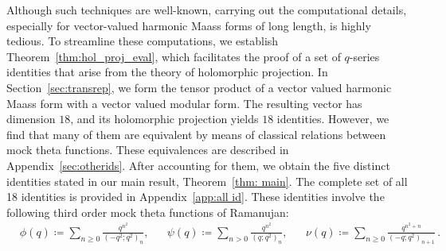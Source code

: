 \documentclass[11pt,reqno]{amsart}
\renewcommand{\=}{\;=\;}
\theoremstyle{myremark}
\begin{document}
Although such techniques are well-known, carrying out the computational details, especially for vector-valued harmonic Maass forms of long length, is highly tedious. 
To streamline these computations, we establish Theorem~\ref{thm:hol_proj_eval}, which facilitates the proof of a set of $q$-series identities that arise from the theory of holomorphic projection.
In Section~\ref{sec:transrep}, we form the tensor product of a vector valued harmonic Maass form with a vector valued modular form.
The resulting vector has dimension $18$, and its holomorphic projection yields $18$ identities.
However, we find that many of them are equivalent by means of classical relations between mock theta functions. 
These equivalences are described in Appendix~\ref{sec:otherids}. 
After accounting for them, we obtain the five distinct identities stated in our main result, Theorem~\ref{thm: main}.
The complete set of all 18 identities is provided in Appendix~\ref{app:all id}.
These identities involve the following third order mock theta functions of Ramanujan:
\begin{align} \label{eq: RMTF}
&
\phi(q)\coloneqq \sum_{n\geq 0}\frac{q^{n^2}}{(-q^2;q^2)_n},
&&
\psi(q)\coloneqq \sum_{n>0}\frac{q^{n^2}}{(q;q^2)_n},
&&
\nu(q)\coloneqq \sum_{n\geq 0}\frac{q^{n^2+n}}{(-q;q^2)_{n+1}}\, .
\end{align}
\end{document}
